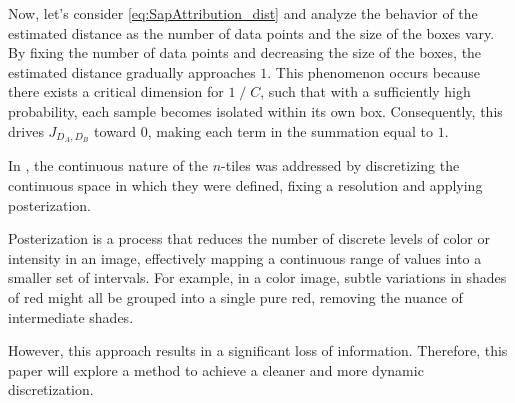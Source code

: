 \noindent Now, let’s consider \cref{eq:SapAttribution_dist} and analyze the behavior of the estimated distance as the number of data points and the size of the boxes vary. By fixing the number of data points and decreasing the size of the boxes, the estimated distance gradually approaches $1$. This phenomenon occurs because there exists a critical dimension for $1 \;/ \; C$, such that with a sufficiently high probability, each sample becomes isolated within its own box. Consequently, this drives $J_{D_A,D_B}$ toward $0$, making each term in the summation equal to $1$.

\bigskip
In \cite{thesis}, the continuous nature of the $n$-tiles was addressed by discretizing the continuous space in which they were defined, fixing a resolution and applying posterization.\begin{toReview} Posterization is a process that reduces the number of discrete levels of color or intensity in an image, effectively mapping a continuous range of values into a smaller set of intervals. For example, in a color image, subtle variations in shades of red might all be grouped into a single pure red, removing the nuance of intermediate shades. \end{toReview} However, this approach results in a significant loss of information. Therefore, this paper will explore a method to achieve a cleaner and more dynamic discretization.
